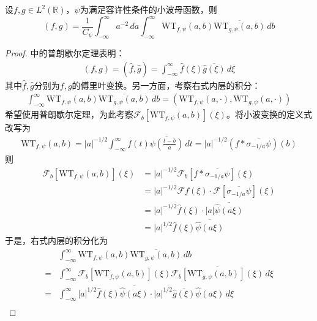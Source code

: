 \begin{theorem}[小波变换的普朗歇尔公式]
    设$f,g\in L^2(\mathbb{R})$，$\psi$为满足容许性条件的小波母函数，则
    \[(f,g)=\frac{1}{C_{\psi}}\int_{-\infty}^{\infty}a^{-2}\,da\int_{-\infty}^{\infty}\mathrm{WT} _{f,\psi}(a,b)\overline{\mathrm{WT} _{g,\psi}(a,b)}\,db\]
\end{theorem}
\begin{proof}
    中的普朗歇尔定理表明：
    \begin{align*}
        (f,g)=(\hat{f},\hat{g})=\int_{-\infty}^{\infty}\hat{f}(\xi)\overline{\hat{g}(\xi)}\,d\xi
    \end{align*}
    其中$\hat{f},\hat{g}$分别为$f,g$的傅里叶变换。另一方面，考察右式内层的积分：
    \begin{align*}
        \int_{-\infty}^{\infty}\mathrm{WT} _{f,\psi}(a,b)\overline{\mathrm{WT} _{g,\psi}(a,b)}\,db=\left( \mathrm{WT} _{f,\psi}(a,\cdot),\mathrm{WT} _{g,\psi}(a,\cdot)\right)
    \end{align*}
    希望使用普朗歇尔定理，为此考察$\mathcal{F} _b[\mathrm{WT} _{f,\psi}(a,b)](\xi)$。将小波变换的定义式改写为
    \begin{align*}
        \mathrm{WT} _{f,\psi}(a,b)=|a|^{-1/2}\int_{-\infty}^{\infty}f(t)\overline{\psi\left(\frac{t-b}{a}\right)}\,dt=|a|^{-1/2}(f*\overline{\sigma_{-1/a}\psi})(b)
    \end{align*}
    则
    \begin{align*}
        \mathcal{F} _b[\mathrm{WT} _{f,\psi}(a,b)](\xi)&=|a|^{-1/2}\mathcal{F} _b[f*\overline{\sigma_{-1/a}\psi}](\xi)\\
        &=|a|^{-1/2}\mathcal{F} f(\xi)\cdot \mathcal{F} [\overline{\sigma_{-1/a}\psi}](\xi)\\
        &=|a|^{-1/2}\hat{f}(\xi)\cdot |a|\overline{\hat{\psi}(a\xi)}\\
        &=|a|^{1/2}\hat{f}(\xi)\overline{\hat{\psi}(a\xi)}
    \end{align*}
    于是，右式内层的积分化为
    \begin{align*}
        &\int_{-\infty}^{\infty}\mathrm{WT} _{f,\psi}(a,b)\overline{\mathrm{WT} _{g,\psi}(a,b)}\,db\\
        =&\int_{-\infty}^{\infty}\mathcal{F} _b[\mathrm{WT} _{f,\psi}(a,b)](\xi)\overline{\mathcal{F} _b[\mathrm{WT} _{g,\psi}(a,b)](\xi)}\,d\xi\\
        =&\int_{-\infty}^{\infty}|a|^{1/2}\hat{f}(\xi)\overline{\hat{\psi}(a\xi)}\cdot |a|^{1/2}\overline{\hat{g}(\xi)}\hat{\psi}(a\xi)\,d\xi\\

\end{align*}
\end{proof}
